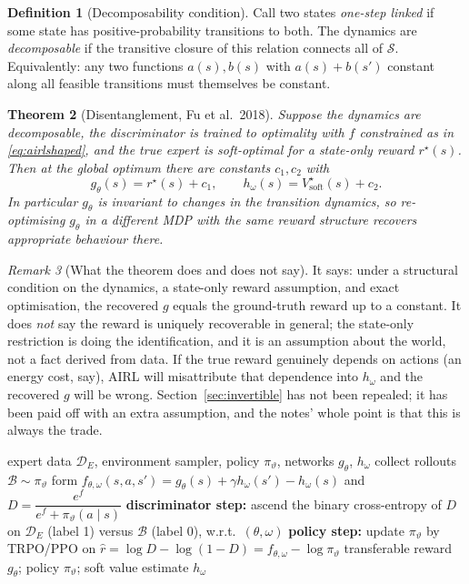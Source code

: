 \documentclass[11pt]{article}
\theoremstyle{plain}
\newtheorem{theorem}{Theorem}[section]
\theoremstyle{definition}
\newtheorem{definition}[theorem]{Definition}
\theoremstyle{remark}
\newtheorem{remark}[theorem]{Remark}
\renewcommand{\S}{\mathcal{S}}
\newcommand{\soft}{\mathrm{soft}}
\begin{document}
\begin{definition}[Decomposability condition]
Call two states \emph{one-step linked} if some state has positive-probability
transitions to both. The dynamics are \emph{decomposable} if the
transitive closure of this relation connects all of $\S$. Equivalently:
any two functions $a(s),b(s)$ with $a(s)+b(s')$ constant along all
feasible transitions must themselves be constant.
\end{definition}

\begin{theorem}[Disentanglement, Fu et al.\ 2018]\label{thm:disentangle}
Suppose the dynamics are decomposable, the discriminator is trained to
optimality with $f$ constrained as in \eqref{eq:airlshaped}, and the true
expert is soft-optimal for a state-only reward $r^\star(s)$. Then at the
global optimum there are constants $c_1,c_2$ with
\begin{equation}
g_\theta(s) = r^\star(s) + c_1, \qquad h_\omega(s) = V^\star_\soft(s) + c_2.
\label{eq:disentangleresult}
\end{equation}
In particular $g_\theta$ is invariant to changes in the transition
dynamics, so re-optimising $g_\theta$ in a different MDP with the same
reward structure recovers appropriate behaviour there.
\end{theorem}

\begin{remark}[What the theorem does and does not say]
It says: under a structural condition on the dynamics, a state-only
reward assumption, and exact optimisation, the recovered $g$ equals the
ground-truth reward up to a constant. It does \emph{not} say the reward is
uniquely recoverable in general; the state-only restriction is doing the
identification, and it is an assumption about the world, not a fact
derived from data. If the true reward genuinely depends on actions (an
energy cost, say), AIRL will misattribute that dependence into $h_\omega$
and the recovered $g$ will be wrong. Section~\ref{sec:invertible} has not
been repealed; it has been paid off with an extra assumption, and the
notes' whole point is that this is always the trade.
\end{remark}

\begin{algorithm}[H]
\caption{AIRL (Fu, Luo \& Levine, 2018)}
\begin{algorithmic}[1]
\Require expert data $\mathcal{D}_E$, environment sampler, policy
$\pi_\vartheta$, networks $g_\theta$, $h_\omega$
  \State collect rollouts $\mathcal{B}\sim\pi_\vartheta$
  \State form $f_{\theta,\omega}(s,a,s') = g_\theta(s) + \gamma
  h_\omega(s') - h_\omega(s)$ and $D = \dfrac{e^f}{e^f+\pi_\vartheta(a\mid
  s)}$
  \State \textbf{discriminator step:} ascend the binary cross-entropy of
  $D$ on $\mathcal{D}_E$ (label 1) versus $\mathcal{B}$ (label 0), w.r.t.\
  $(\theta,\omega)$
  \State \textbf{policy step:} update $\pi_\vartheta$ by TRPO/PPO on
  $\hat r = \log D - \log(1-D) = f_{\theta,\omega} - \log\pi_\vartheta$
\EndFor
\State \Return transferable reward $g_\theta$; policy $\pi_\vartheta$;
soft value estimate $h_\omega$
\end{algorithmic}
\label{alg:airl}
\end{algorithm}
\end{document}
